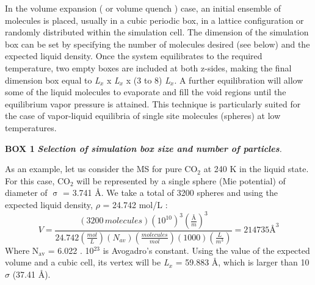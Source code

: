 \documentclass{scrbook}
\begin{document}
In the volume expansion ( or volume quench \citep{holcomb1993} ) case,
an initial ensemble of molecules is placed,  usually in a cubic periodic box,
in a lattice configuration or randomly distributed within the simulation cell.
The dimension of the simulation box can be set by specifying the number of
molecules desired (see below) and the expected liquid density. Once the system
equilibrates to the required temperature, two empty boxes are included at both
z-sides, making the final dimension box equal to \textit{L}$_{x}$
x \textit{L}$_{x}$ x (3 to 8) \textit{L}$_{x}$.  A further equilibration will
allow some of the liquid molecules to evaporate and fill the void regions until
the equilibrium vapor pressure is attained. This technique is particularly
suited for the case of vapor-liquid equilibria of single site molecules
(spheres) at low temperatures. 

\textbf{BOX 1} \textbf{\textit{Selection of simulation box size and number of particles}}\textit{.}

As an example, let us consider the MS for pure CO$_{2}$ at 240 K in the liquid
state. For this case, CO$_{2}$ will be represented by a single sphere (Mie
potential) of diameter of {${\upsigma}$} = 3.741 \AA{}\citep{avendano2011}. We take a total of 3200 spheres
and using the expected liquid density, ${\rho}$ = 24.742 mol/L \citep{lemmon2013}:
\begin{equation}
V=\frac{\left(3200\,molecules\right)\left(10^{10}\right)^{3}\left(\frac{\textrm{Å}}{m}\right)^{3}}{24.742\left(\frac{mol}{L}\right)\left(N_{av}\right)\left(\frac{molecules}{mol}\right)\left(1000\right)\left(\frac{L}{m^{3}}\right)}=214735\textrm{Å}^{3}
\end{equation}
Where N$_{\mathrm{av}}$ = 6.022 . 10$^{23}$ is Avogadro's constant. Using the
value of the expected volume and a cubic cell, its vertex will be
\textit{L}$_{x}$ = 59.883 \AA{}, which is larger than 10 ${\sigma}$  (37.41
\AA{}). 
\end{document}
